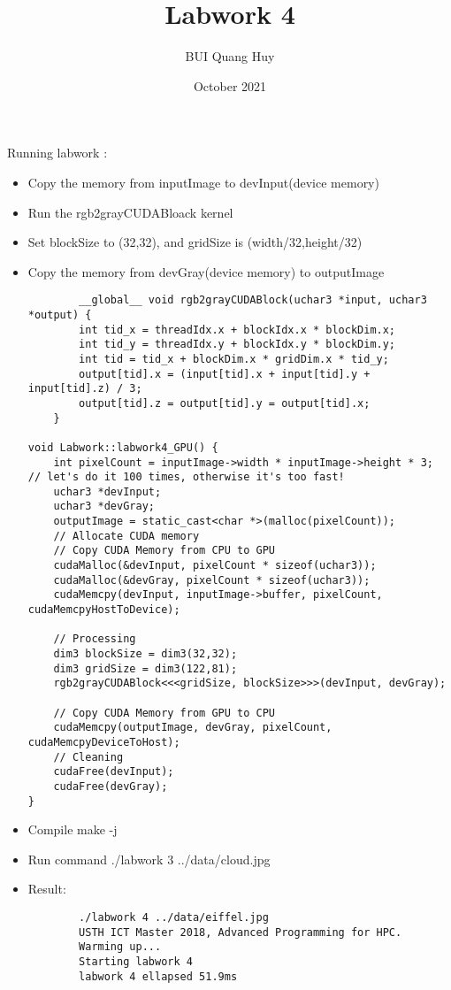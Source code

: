 \documentclass{article}
\title{Labwork 4}
\author{BUI Quang Huy}
\date{October 2021}
\begin{document}
\maketitle

Running labwork :
\begin{itemize}
    \item Copy the memory from inputImage to devInput(device memory)
    \item Run the rgb2grayCUDABloack kernel
    \item Set blockSize to (32,32), and gridSize is (width/32,height/32)
    \item Copy the memory from devGray(device memory) to outputImage
    \begin{lstlisting}
        __global__ void rgb2grayCUDABlock(uchar3 *input, uchar3 *output) {
        int tid_x = threadIdx.x + blockIdx.x * blockDim.x;
        int tid_y = threadIdx.y + blockIdx.y * blockDim.y;
        int tid = tid_x + blockDim.x * gridDim.x * tid_y;
        output[tid].x = (input[tid].x + input[tid].y + input[tid].z) / 3;
        output[tid].z = output[tid].y = output[tid].x;
    }

void Labwork::labwork4_GPU() {
    int pixelCount = inputImage->width * inputImage->height * 3;  // let's do it 100 times, otherwise it's too fast!
    uchar3 *devInput;
    uchar3 *devGray;
    outputImage = static_cast<char *>(malloc(pixelCount));
    // Allocate CUDA memory
    // Copy CUDA Memory from CPU to GPU
    cudaMalloc(&devInput, pixelCount * sizeof(uchar3));
    cudaMalloc(&devGray, pixelCount * sizeof(uchar3));
    cudaMemcpy(devInput, inputImage->buffer, pixelCount, cudaMemcpyHostToDevice);

    // Processing
    dim3 blockSize = dim3(32,32);
    dim3 gridSize = dim3(122,81);
    rgb2grayCUDABlock<<<gridSize, blockSize>>>(devInput, devGray);
    
    // Copy CUDA Memory from GPU to CPU
    cudaMemcpy(outputImage, devGray, pixelCount, cudaMemcpyDeviceToHost);
    // Cleaning
    cudaFree(devInput);
    cudaFree(devGray);
}
    \end{lstlisting}
    \item Compile make -j
    \item Run command ./labwork 3 ../data/cloud.jpg
    \item Result:\begin{lstlisting}
        ./labwork 4 ../data/eiffel.jpg
        USTH ICT Master 2018, Advanced Programming for HPC.
        Warming up...
        Starting labwork 4
        labwork 4 ellapsed 51.9ms
    \end{lstlisting}
\end{itemize}
\end{document}
